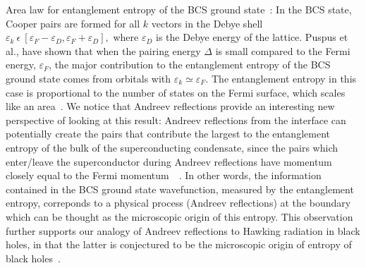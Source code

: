 \documentclass[10pt,letterpaper,aps,onecolumn,superscriptaddress,floatfix,notitlepage]{revtex4-1}
\begin{document}
	Area law for entanglement entropy of the BCS ground state~\cite{puspus2014entanglement}: In the BCS state, Cooper pairs are formed for all $k$ vectors in the Debye shell $\varepsilon_{k}~\epsilon~[\varepsilon_{F}-\varepsilon_{D},\varepsilon_{F}+\varepsilon_{D}],$ where $\varepsilon_{D}$ is the Debye energy of the lattice. Puspus et al., have shown that when the pairing energy $\Delta$ is small compared to the Fermi energy, $\varepsilon_{F}$, the major contribution to the entanglement entropy of the BCS ground state comes from orbitals with $\varepsilon_{k}\simeq\varepsilon_{F}$. The entanglement entropy in this case is proportional to the number of states on the Fermi surface, which scales like an area~\cite{puspus2014entanglement}.  We notice that Andreev reflections provide an interesting new perspective of looking at this result: Andreev reflections from the interface can potentially create the pairs that contribute the largest to the entanglement entropy of the bulk of the superconducting condensate, since the pairs which enter/leave the superconductor during Andreev reflections have momentum closely equal to the Fermi momentum~~\cite{andreev,Pannet,spintron,artemenko1978excess,artemenko1979theory,artemenko1979excess,zaitsev1980theory}. In other words, the information contained in the BCS ground state wavefunction, measured by the entanglement entropy, correponds to a physical process (Andreev reflections) at the boundary which can be thought as the microscopic origin of this entropy. This observation further supports our analogy of Andreev reflections to Hawking radiation in black holes, in that the latter is conjectured to be the microscopic origin of entropy of black holes~\cite{srednicki1993entropy,das2008black,bombelli1986quantum}.
	
\end{document}
